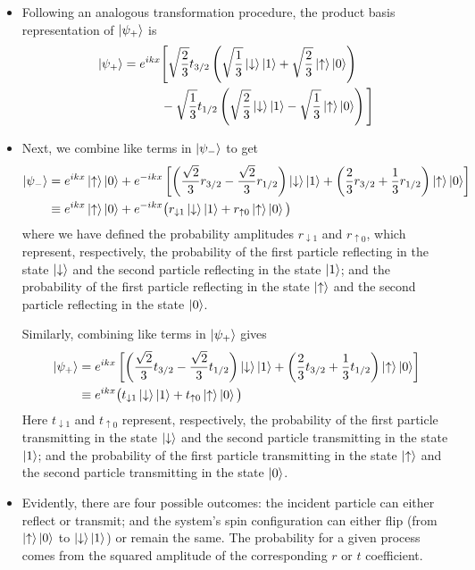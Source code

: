 \documentclass[11pt, a4paper]{article}
\newcommand{\ua}{\uparrow}  %
\newcommand{\da}{\downarrow}  %
\begin{document}
\begin{itemize}
	\item Following an analogous transformation procedure, the product basis representation of $ \ket{\psi_{+}} $ is
	\begin{align*}
		\ket{\psi_{+}} =  e^{ikx}& \Bigg[\sqrt{\frac{2}{3}}t_{3/2}\left(\sqrt{\frac{1}{3}}\ket{\da}\ket{1} +  \sqrt{\frac{2}{3}}\ket{\ua}\ket{0}\right) \\
		&- \sqrt{\frac{1}{3}}t_{1/2}\left( \sqrt{\frac{2}{3}}\ket{\da}\ket{1} - \sqrt{\frac{1}{3}}\ket{\ua}\ket{0} \right)\Bigg]
	\end{align*}
	
	\item Next, we combine like terms in $ \ket{\psi_{-}} $ to get
	\begin{align*}
		\ket{\psi_{-}} &= e^{ikx}\ket{\ua}\ket{0} + e^{-ikx}\left[\left(\frac{\sqrt{2}}{3}r_{3/2} - \frac{\sqrt{2}}{3}r_{1/2}\right)\ket{\da}\ket{1} + \left(\frac{2}{3}r_{3/2} + \frac{1}{3}r_{1/2}\right)\ket{\ua}\ket{0}\right]\\
		&\equiv e^{ikx}\ket{\ua}\ket{0} + e^{-ikx}\big(r_{\da 1}\ket{\da}\ket{1} + r_{\ua 0}\ket{\ua}\ket{0}\big)
	\end{align*}
	where we have defined the probability amplitudes $ r_{\da 1} $ and $ r_{\ua 0} $, which represent, respectively, the probability of the first particle reflecting in the state $ \ket{\da} $ and the second particle reflecting in the state $ \ket{1} $; and the probability of the first particle reflecting in the state $ \ket{\ua} $ and the second particle reflecting in the state $ \ket{0} $. 
	
	
	Similarly, combining like terms in $ \ket{\psi_{+}} $ gives 
	\begin{align*}
		\ket{\psi_{+}} &= e^{ikx}\left[\left(\frac{\sqrt{2}}{3}t_{3/2} - \frac{\sqrt{2}}{3}t_{1/2}\right)\ket{\da}\ket{1} + \left(\frac{2}{3}t_{3/2} + \frac{1}{3}t_{1/2}\right)\ket{\ua}\ket{0}\right]\\
		& \equiv e^{ikx} \big( t_{\da 1}\ket{\da}\ket{1} + t_{\ua 0}\ket{\ua}\ket{0} \big)
	\end{align*}
	Here $ t_{\da 1} $ and $ t_{\ua 0} $ represent, respectively, the probability of the first particle transmitting in the state $ \ket{\da} $ and the second particle transmitting in the state $ \ket{1} $; and the probability of the first particle transmitting in the state $ \ket{\ua} $ and the second particle transmitting in the state $ \ket{0} $.
	
	\item Evidently, there are four possible outcomes: the incident particle can either reflect or transmit; and the system's spin configuration can either flip (from $ \ket{\ua}\ket{0} $ to $ \ket{\da}\ket{1} $) or remain the same. The probability for a given process comes from the squared amplitude of the corresponding $ r $ or $ t $ coefficient.
	

\end{itemize}
\end{document}
